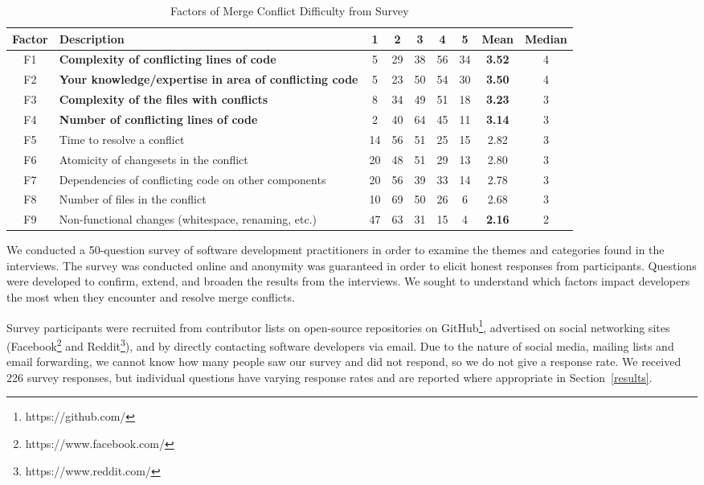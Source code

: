 \begin{table*}[!htbp]
\renewcommand{\arraystretch}{1.3}
\caption{Factors of Merge Conflict Difficulty from Survey}
\label{survey_merge_conflicts}
\centering
\begin{tabularx}{0.78\textwidth}{c | l | *5{c} | *2{c}}

\toprule
	Factor & Description & 1 & 2 & 3 & 4 & 5 & Mean & Median \\
\midrule
	F1 & \textbf{Complexity of conflicting lines of code} & 5 & 29 & 38 & 56 & 34 & \textbf{3.52} & 4 \\
	F2 & \textbf{Your knowledge/expertise in area of conflicting code} & 5 & 23 & 50 & 54 & 30 & \textbf{3.50} & 4 \\
	F3 & \textbf{Complexity of the files with conflicts} & 8 & 34 & 49 & 51 & 18 & \textbf{3.23} & 3 \\
	F4 & \textbf{Number of conflicting lines of code} & 2 & 40 & 64 & 45 & 11 & \textbf{3.14} & 3 \\
	F5 & Time to resolve a conflict & 14 & 56 & 51 & 25 & 15 & 2.82 & 3 \\
	F6 & Atomicity of changesets in the conflict & 20 & 48 & 51 & 29 & 13 & 2.80 & 3 \\
	F7 & Dependencies of conflicting code on other components & 20 & 56 & 39 & 33 & 14 & 2.78 & 3 \\
	F8 & Number of files in the conflict & 10 & 69 & 50 & 26 & 6 & 2.68 & 3 \\
	F9 & Non-functional changes (whitespace, renaming, etc.) & 47 & 63 & 31 & 15 & 4 & \textbf{2.16} & 2 \\
\bottomrule
\end{tabularx}
\end{table*}

We conducted a 50-question survey of software development practitioners in order to examine the themes and categories found in the interviews.
The survey was conducted online and anonymity was guaranteed in order to elicit honest responses from participants.
Questions were developed to confirm, extend, and broaden the results from the interviews.
We sought to understand which factors impact developers the most when they encounter and resolve merge conflicts.

Survey participants were recruited from contributor lists on open-source repositories on GitHub\footnote{https://github.com/}, advertised on social networking sites (Facebook\footnote{https://www.facebook.com/} and Reddit\footnote{https://www.reddit.com/}), and by directly contacting software developers via email. Due to the nature of social media, mailing lists and email forwarding, we cannot know how many people saw our survey and did not respond, so we do not give a response rate.
We received 226 survey responses, but individual questions have varying response rates and are reported where appropriate in Section~\ref{results}.


